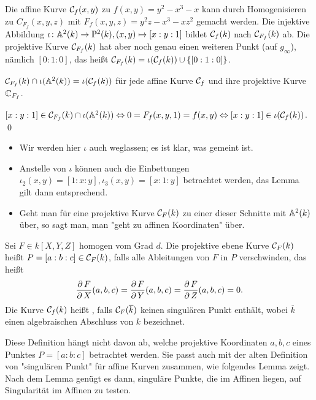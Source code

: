 \begin{bsp}
	Die affine Kurve $\mathcal{C}_f(x,y)$ zu $f(x,y) = y^2-x^3-x$ kann durch Homogenisieren zu $C_{F_f}(x,y,z)$ mit $F_f(x,y,z) = y^2z-x^3-xz^2$ gemacht werden. 
	Die injektive Abbildung $\iota\colon \mathbb{A}^2(k) \rightarrow \mathbb{P}^2(k), (x,y) \mapsto [x:y:1]$ bildet $\mathcal{C}_f(k)$ nach $\mathcal{C}_{F_f}(k)$ ab. 
	Die projektive Kurve $\mathcal{C}_{F_f}(k)$ hat aber noch genau einen weiteren Punkt (auf $g_\infty$), nämlich $[0:1:0]$, das heißt $\mathcal{C}_{F_f}(k) = \iota(\mathcal{C}_f(k)) \cup \{[0:1:0]\}$.
\end{bsp}

\begin{lemma}
	$\mathcal{C}_{F_f}(k) \cap \iota(\mathbb{A}^2(k)) = \iota(\mathcal{C}_f(k))$ für jede affine Kurve $\mathcal{C}_f$ und ihre projektive Kurve $\mathbb{C}_{F_f}$.
\end{lemma}

	$[x:y:1] \in \mathcal{C}_{F_f}(k) \cap \iota(\mathbb{A}^2(k)) \Leftrightarrow 0 = F_f(x,y,1) = f(x,y) \Leftrightarrow [x:y:1] \in \iota(\mathcal{C}_f(k))$. \qed
	
\begin{bem}
	\begin{itemize}
		\item Wir werden hier $\iota$ auch weglassen; es ist klar, was gemeint ist.
		\item Anstelle von $\iota$ können auch die Einbettungen $\iota_2(x,y) = [1:x:y], \iota_3(x,y) = [x:1:y]$ betrachtet werden, das Lemma gilt dann entsprechend.
		\item Geht man für eine projektive Kurve $\mathcal{C}_F(k)$ zu einer dieser Schnitte mit $\mathbb{A}^2(k)$ über, so sagt man, man "geht zu affinen Koordinaten" über.
	\end{itemize}
\end{bem}

\begin{defn}
	Sei $F \in k[X,Y,Z]$ homogen vom Grad $d$. 
	Die projektive ebene Kurve $\mathcal{C}_F(k)$ heißt  \linebreak $P=[a:b:c] \in \mathcal{C}_F(k)$, falls alle Ableitungen von $F$ in $P$ verschwinden, das heißt
	\[ \frac{\operatorname{\partial} F}{\operatorname{\partial} X}(a,b,c) = \frac{\operatorname{\partial} F}{\operatorname{\partial} Y}(a,b,c) = \frac{\operatorname{\partial} F}{\operatorname{\partial} Z}(a,b,c) = 0.\]
	Die Kurve $\mathcal{C}_f(k)$ heißt , falls $\mathcal{C}_F(\overline{k})$ keinen singulären Punkt enthält, wobei $\overline{k}$ einen algebraischen Abschluss von $k$ bezeichnet. 
\end{defn}

\begin{bem}
	Diese Definition hängt nicht davon ab, welche projektive Koordinaten $a,b,c$ eines Punktes $P = [a:b:c]$ betrachtet werden. 
	Sie passt auch mit der alten Definition von "singulären Punkt" für affine Kurven zusammen, wie folgendes Lemma zeigt. 
	Nach dem Lemma genügt es dann, singuläre Punkte, die im Affinen liegen, auf Singularität im Affinen zu testen.
\end{bem}

